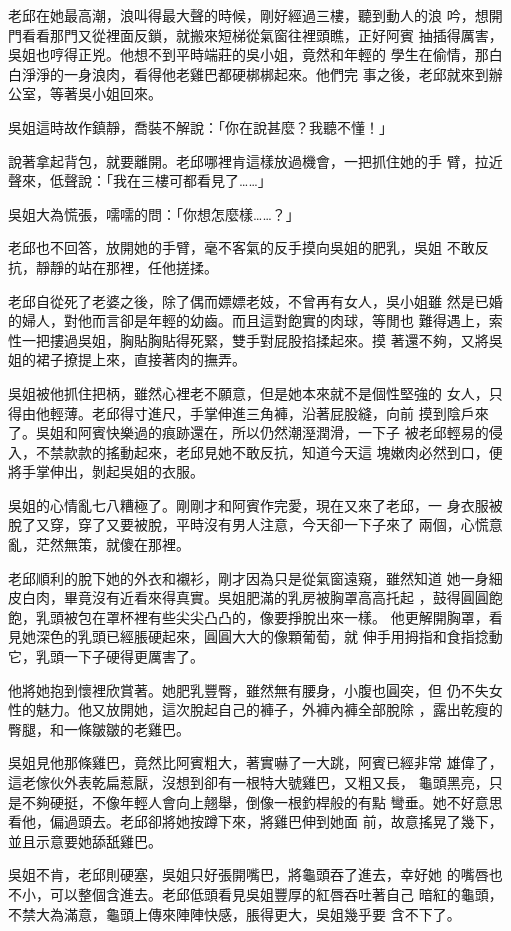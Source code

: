 老邱在她最高潮，浪叫得最大聲的時候，剛好經過三樓，聽到動人的浪
吟，想開門看看那門又從裡面反鎖，就搬來短梯從氣窗往裡頭瞧，正好阿賓
抽插得厲害，吳姐也哼得正兇。他想不到平時端莊的吳小姐，竟然和年輕的
學生在偷情，那白白淨淨的一身浪肉，看得他老雞巴都硬梆梆起來。他們完
事之後，老邱就來到辦公室，等著吳小姐回來。

吳姐這時故作鎮靜，喬裝不解說：「你在說甚麼？我聽不懂！」

說著拿起背包，就要離開。老邱哪裡肯這樣放過機會，一把抓住她的手
臂，拉近聲來，低聲說：「我在三樓可都看見了……」

吳姐大為慌張，嚅嚅的問：「你想怎麼樣……？」

老邱也不回答，放開她的手臂，毫不客氣的反手摸向吳姐的肥乳，吳姐
不敢反抗，靜靜的站在那裡，任他搓揉。

老邱自從死了老婆之後，除了偶而嫖嫖老妓，不曾再有女人，吳小姐雖
然是已婚的婦人，對他而言卻是年輕的幼齒。而且這對飽實的肉球，等閒也
難得遇上，索性一把摟過吳姐，胸貼胸貼得死緊，雙手對屁股掐揉起來。摸
著還不夠，又將吳姐的裙子撩提上來，直接著肉的撫弄。

吳姐被他抓住把柄，雖然心裡老不願意，但是她本來就不是個性堅強的
女人，只得由他輕薄。老邱得寸進尺，手掌伸進三角褲，沿著屁股縫，向前
摸到陰戶來了。吳姐和阿賓快樂過的痕跡還在，所以仍然潮溼潤滑，一下子
被老邱輕易的侵入，不禁款款的搖動起來，老邱見她不敢反抗，知道今天這
塊嫩肉必然到口，便將手掌伸出，剝起吳姐的衣服。

吳姐的心情亂七八糟極了。剛剛才和阿賓作完愛，現在又來了老邱，一
身衣服被脫了又穿，穿了又要被脫，平時沒有男人注意，今天卻一下子來了
兩個，心慌意亂，茫然無策，就傻在那裡。

老邱順利的脫下她的外衣和襯衫，剛才因為只是從氣窗遠窺，雖然知道
她一身細皮白肉，畢竟沒有近看來得真實。吳姐肥滿的乳房被胸罩高高托起
，鼓得圓圓飽飽，乳頭被包在罩杯裡有些尖尖凸凸的，像要掙脫出來一樣。
他更解開胸罩，看見她深色的乳頭已經脹硬起來，圓圓大大的像顆葡萄，就
伸手用拇指和食指捻動它，乳頭一下子硬得更厲害了。

他將她抱到懷裡欣賞著。她肥乳豐臀，雖然無有腰身，小腹也圓突，但
仍不失女性的魅力。他又放開她，這次脫起自己的褲子，外褲內褲全部脫除
，露出乾瘦的臀腿，和一條皺皺的老雞巴。

吳姐見他那條雞巴，竟然比阿賓粗大，著實嚇了一大跳，阿賓已經非常
雄偉了，這老傢伙外表乾扁惹厭，沒想到卻有一根特大號雞巴，又粗又長，
龜頭黑亮，只是不夠硬挺，不像年輕人會向上翹舉，倒像一根釣桿般的有點
彎垂。她不好意思看他，偏過頭去。老邱卻將她按蹲下來，將雞巴伸到她面
前，故意搖晃了幾下，並且示意要她舔舐雞巴。

吳姐不肯，老邱則硬塞，吳姐只好張開嘴巴，將龜頭吞了進去，幸好她
的嘴唇也不小，可以整個含進去。老邱低頭看見吳姐豐厚的紅唇吞吐著自己
暗紅的龜頭，不禁大為滿意，龜頭上傳來陣陣快感，脹得更大，吳姐幾乎要
含不下了。


